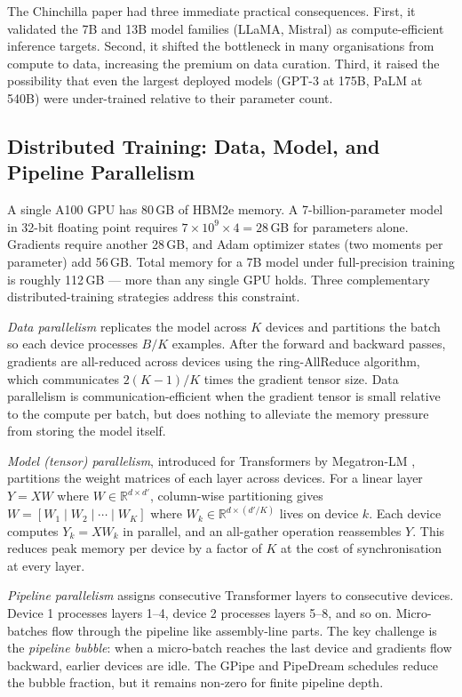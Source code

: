 \begin{deepdive}
The Chinchilla paper had three immediate practical consequences.  First, it
validated the 7B and 13B model families (LLaMA, Mistral) as compute-efficient
inference targets.  Second, it shifted the bottleneck in many organisations
from compute to data, increasing the premium on data curation.  Third, it
raised the possibility that even the largest deployed models (GPT-3 at 175B,
PaLM at 540B) were under-trained relative to their parameter count.

\subsection{Distributed Training: Data, Model, and Pipeline Parallelism}
\label{subsec:distributed-training}

A single A100 GPU has 80\,GB of HBM2e memory.  A 7-billion-parameter model in
32-bit floating point requires $7 \times 10^9 \times 4 = 28$\,GB for parameters
alone.  Gradients require another 28\,GB, and Adam optimizer states (two moments
per parameter) add 56\,GB.  Total memory for a 7B model under full-precision
training is roughly 112\,GB --- more than any single GPU holds.  Three
complementary distributed-training strategies address this constraint.

\emph{Data parallelism} replicates the model across $K$ devices and partitions
the batch so each device processes $B/K$ examples.  After the forward and
backward passes, gradients are all-reduced across devices using the ring-AllReduce
algorithm, which communicates $2(K-1)/K$ times the gradient tensor size.
Data parallelism is communication-efficient when the gradient tensor is small
relative to the compute per batch, but does nothing to alleviate the memory
pressure from storing the model itself.

\emph{Model (tensor) parallelism}, introduced for Transformers by Megatron-LM
\cite{shoeybi2019megatron}, partitions the weight matrices of each layer across
devices.  For a linear layer $Y = XW$ where $W \in \mathbb{R}^{d \times d'}$,
column-wise partitioning gives $W = [W_1 \mid W_2 \mid \cdots \mid W_K]$ where
$W_k \in \mathbb{R}^{d \times (d'/K)}$ lives on device $k$.  Each device
computes $Y_k = X W_k$ in parallel, and an all-gather operation reassembles $Y$.
This reduces peak memory per device by a factor of $K$ at the cost of
synchronisation at every layer.

\emph{Pipeline parallelism} assigns consecutive Transformer layers to consecutive
devices.  Device 1 processes layers 1--4, device 2 processes layers 5--8, and so
on.  Micro-batches flow through the pipeline like assembly-line parts.  The
key challenge is the \emph{pipeline bubble}: when a micro-batch reaches the
last device and gradients flow backward, earlier devices are idle.  The GPipe
and PipeDream schedules reduce the bubble fraction, but it remains non-zero
for finite pipeline depth.


\end{deepdive}
